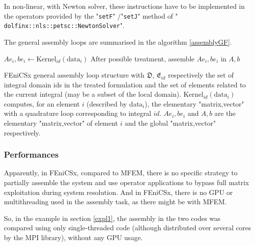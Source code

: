 \documentclass[12pt]{article}
\newcommand{\mycode}[1]{\textsf{"}\lstinline`#1`\textsf{"}}
\begin{document}
In non-linear, with Newton solver, these instructions have to be implemented in the operators provided by the \mycode{setF} /\mycode{setJ} method of \mycode{ dolfinx::nls::petsc::NewtonSolver}.

\bigskip
The general assembly loops are summarised in the algorithm \ref{assemblyGF}.
\begin{algorithm}[h]
	\footnotesize
    \begin{algorithmic}
\State $Ae_i,be_i\gets \text{Kernel}_{id}(\text{data}_i)$ 
\State After possible treatment, assemble $Ae_i,be_i$ in $A,b$
\EndFor\EndFor
	\end{algorithmic}
	\caption{FEniCSx general assembly loop structure with $\mathfrak{D}$, $\mathfrak{E}_{id}$ respectively the set of integral domain ids  in the treated formulation and the set of elements related to the current integral (may be a subset of the local domain). $\text{Kernel}_{id}(\text{data}_i)$ computes, for an element $i$ (described by data$_i$), the elementary "matrix,vector" with a quadrature loop corresponding to integral $id$. $Ae_i,be_i$ and $A,b$ are the elementary "matrix,vector" of element $i$ and the global "matrix,vector" respectively.\label{assemblyGF}}
\end{algorithm}


\subsubsection{Performances\label{perfass}}
Apparently, in FEniCSx, compared to MFEM, there is no specific strategy to partially assemble the system and use operator applications to bypass full matrix exploitation during system resolution.
And in FEniCSx, there is no GPU or multithreading used in the assembly task, as there might be with MFEM. 

So, in the example in section \ref{expl1}, the assembly in the two codes was compared using only single-threaded code (although distributed over several cores by the MPI library), without any GPU usage.
\end{document}
